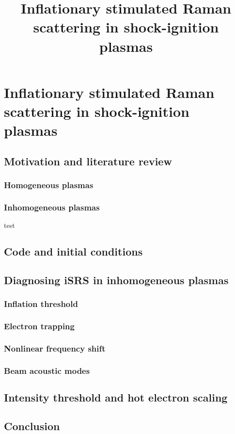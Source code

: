 
\chapter{Inflationary stimulated Raman scattering in shock-ignition plasmas}
\label{chp:iSRS}

\title{Inflationary stimulated Raman scattering in shock-ignition plasmas}

\section{Motivation and literature review}
\subsection{Homogeneous plasmas}
\subsection{Inhomogeneous plasmas}
test\cite{Vu2001}


\section{Code and initial conditions}\label{sec:code&IC}

\section{Diagnosing iSRS in inhomogeneous plasmas}\label{sec:signatures}
\subsection{Inflation threshold}
\subsection{Electron trapping}
\subsection{Nonlinear frequency shift}
\subsection{Beam acoustic modes}

\section{Intensity threshold and hot electron scaling}\label{sec:paramScan}

\section{Conclusion}\label{sec:conclusion}






